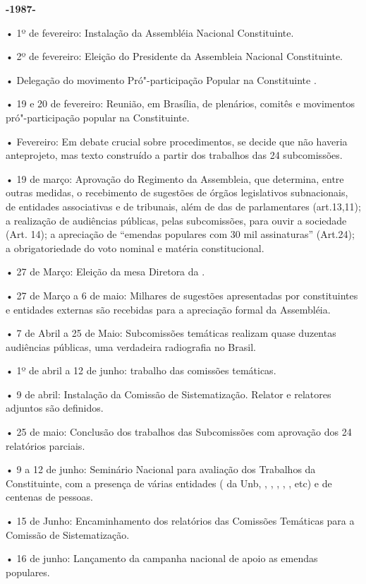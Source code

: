 \textbf{-1987-}

• 1º de fevereiro: Instalação da Assembléia Nacional Constituinte.

• 2º de fevereiro: Eleição do Presidente da Assembleia Nacional
Constituinte.

• Delegação do movimento Pró"-participação Popular na Constituinte .

• 19 e 20 de fevereiro: Reunião, em Brasília, de plenários, comitês e
movimentos pró"-participação popular na Constituinte.

• Fevereiro: Em debate crucial sobre procedimentos, se decide que não
haveria anteprojeto, mas texto construído a partir dos trabalhos das 24
subcomissões.

• 19 de março: Aprovação do Regimento da Assembleia, que determina,
entre outras medidas, o recebimento de sugestões de órgãos legislativos
subnacionais, de entidades associativas e de tribunais, além de das de
parlamentares (art.13,11); a realização de audiências públicas, pelas
subcomissões, para ouvir a sociedade (Art. 14); a apreciação de
``emendas populares com 30 mil assinaturas'' (Art.24); a obrigatoriedade
do voto nominal e matéria constitucional.

• 27 de Março: Eleição da mesa Diretora da .

• 27 de Março a 6 de maio: Milhares de sugestões apresentadas por
constituintes e entidades externas são recebidas para a apreciação
formal da Assembléia.

• 7 de Abril a 25 de Maio: Subcomissões temáticas realizam quase
duzentas audiências públicas, uma verdadeira radiografia no Brasil.

• 1º de abril a 12 de junho: trabalho das comissões temáticas.

• 9 de abril: Instalação da Comissão de Sistematização. Relator e
relatores adjuntos são definidos.

• 25 de maio: Conclusão dos trabalhos das Subcomissões com aprovação dos
24 relatórios parciais.

• 9 a 12 de junho: Seminário Nacional para avaliação dos Trabalhos da
Constituinte, com a presença de várias entidades ( da Unb, ,
, , , , etc) e de centenas de pessoas.

• 15 de Junho: Encaminhamento dos relatórios das Comissões Temáticas
para a Comissão de Sistematização.

• 16 de junho: Lançamento da campanha nacional de apoio as emendas
populares.

